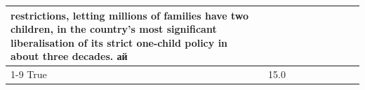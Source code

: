 \begin{table}[H]
\begin{tabular}{lllrlllll}
restrictions, letting millions of families have two children, in the country's most significant liberalisation of its strict one-child policy in about three decades. ай \\
\cline{1-9}
True & 15.0%
\end{tabular}
\end{table}
